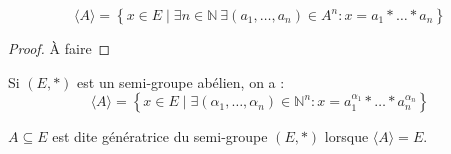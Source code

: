 \begin{proposition}
$$
\langle A \rangle = \left\{ x \in E \;|\;
\exists n \in \mathbb{N} \  \exists \left(a_1, \ldots, a_n\right) \in A^n :
x = a_1 * \ldots * a_n \right\}
$$
\end{proposition}

\begin{proof}
À faire
\end{proof}

\begin{remarque}
Si $(E, *)$ est un semi-groupe abélien, on a :
$$
\langle A \rangle = \left\{ x \in E \;|\;
\exists \left(\alpha_1, \ldots, \alpha_n\right) \in \mathbb{N}^n :
x = a_1^{\alpha_1} * \ldots * a_n^{\alpha_n} \right\}
$$
\end{remarque}

\begin{definition}
$A \subseteq E$ est dite génératrice du semi-groupe $(E, *)$
lorsque $\langle A \rangle = E$.
\end{definition}
